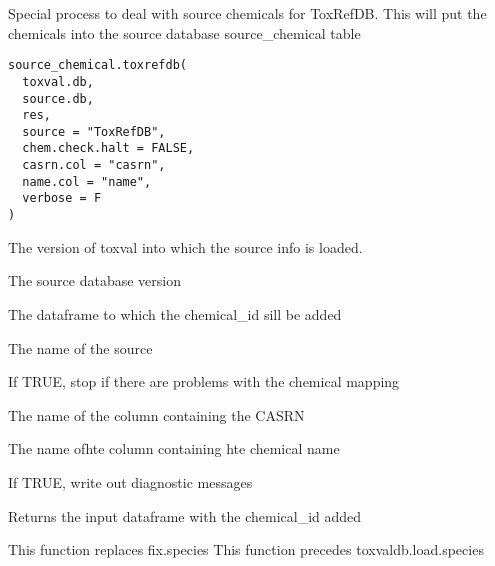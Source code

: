 \documentclass[letterpaper]{book}
\begin{document}
%
\begin{Description}\relax
Special process to deal with source chemicals for ToxRefDB. This will put the
chemicals into the source database source\_chemical table
\end{Description}
%
\begin{Usage}
\begin{verbatim}
source_chemical.toxrefdb(
  toxval.db,
  source.db,
  res,
  source = "ToxRefDB",
  chem.check.halt = FALSE,
  casrn.col = "casrn",
  name.col = "name",
  verbose = F
)
\end{verbatim}
\end{Usage}
%
\begin{Arguments}
\begin{ldescription}
\item[\code{toxval.db}] The version of toxval into which the source info is loaded.

\item[\code{source.db}] The source database version

\item[\code{res}] The dataframe to which the chemical\_id sill be added

\item[\code{source}] The name of the source

\item[\code{chem.check.halt}] If TRUE, stop if there are problems with the chemical mapping

\item[\code{casrn.col}] The name of the column containing the CASRN

\item[\code{name.col}] The name ofhte column containing hte chemical name

\item[\code{verbose}] If TRUE, write out diagnostic messages
\end{ldescription}
\end{Arguments}
%
\begin{Value}
Returns the input dataframe with the chemical\_id added
\end{Value}
%
\begin{Description}\relax
This function replaces fix.species
This function precedes toxvaldb.load.species
\end{Description}
\end{document}
